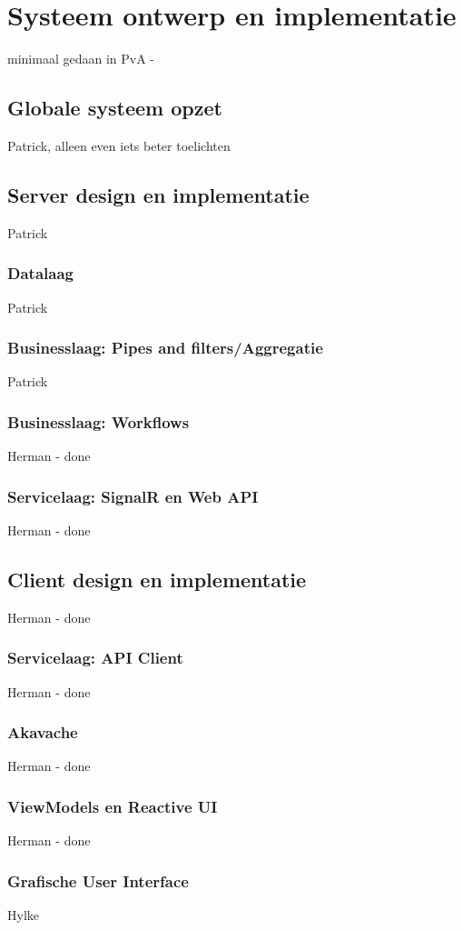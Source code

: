 \chapter{Systeem ontwerp en implementatie} \label{ch:systeem-ontwerp-en-implementatie} 
	minimaal gedaan in PvA - \section{Globale systeem opzet}		Patrick, alleen even iets beter toelichten
	\section{Server design en implementatie}						Patrick
		\subsection{Datalaag}										Patrick
		\subsection{Businesslaag: Pipes and filters/Aggregatie}		Patrick
		\subsection{Businesslaag: Workflows}						Herman - done
		\subsection{Servicelaag: SignalR en Web API}				Herman - done
	\section{Client design en implementatie}						Herman - done
		\subsection{Servicelaag: API Client}						Herman - done
		\subsection{Akavache}										Herman - done
		\subsection{ViewModels en Reactive UI}						Herman - done
		\subsection{Grafische User Interface}						Hylke
